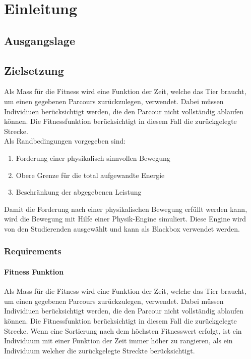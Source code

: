 %
%


\chapter{Einleitung}
  \lipsum[33-35]

\section{Ausgangslage}

\section{Zielsetzung}
  Als Mass für die Fitness wird eine Funktion der Zeit, welche das Tier braucht,
  um einen gegebenen Parcours zurückzulegen, verwendet.
  Dabei müssen Individiuen berücksichtigt werden,
  die den Parcour nicht vollständig ablaufen können.
  Die Fitnessfunktion berücksichtigt in diesem Fall die zurückgelegte Strecke.\\
  Als Randbedingungen vorgegeben sind:
  \begin{enumerate}
    \item Forderung einer physikalisch sinnvollen Bewegung
    \item Obere Grenze für die total aufgewandte Energie
    \item Beschränkung der abgegebenen Leistung
  \end{enumerate}
  Damit die Forderung nach einer physikalischen Bewegung erfüllt werden kann,
  wird die Bewegung mit Hilfe einer Physik-Engine simuliert.
  Diese Engine wird von den Studierenden ausgewählt und kann als Blackbox verwendet werden.

  \subsection{Requirements}
    \subsubsection{Fitness Funktion}
      Als Mass für die Fitness wird eine Funktion der Zeit, welche das Tier braucht,
      um einen gegebenen Parcours zurückzulegen, verwendet.
      Dabei müssen Individiuen berücksichtigt werden,
      die den Parcour nicht vollständig ablaufen können.
      Die Fitnessfunktion berücksichtigt in diesem Fall die zurückgelegte Strecke.
      Wenn eine Sortierung nach dem höchsten Fitnesswert erfolgt,
      ist ein Individuum mit einer Funktion der Zeit immer höher zu rangieren,
      als ein Individuum welcher die zurückgelegte Streckte berücksichtigt.
